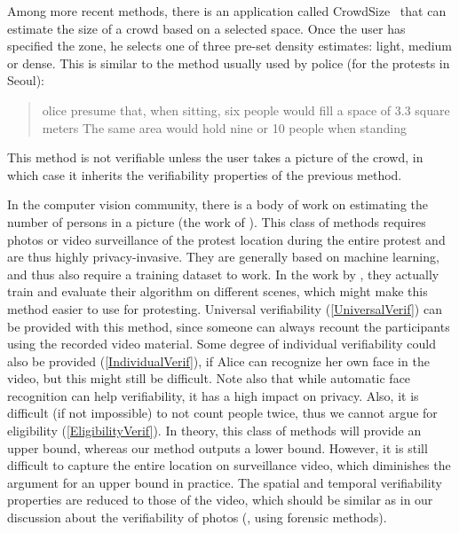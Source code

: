 Among more recent methods, there is an application called CrowdSize~\cite{CrowdSize} that can estimate the size of a crowd 
based on a selected space.
Once the user has specified the zone, he selects one of three pre-set density estimates: light, medium or dense.
This is similar to the method usually used by police (\eg for the protests in Seoul):
\blockcquote{2016DemonstrationsInSeoul}{%
  olice presume that, when sitting, six people would 
  fill a space of 
  3.3 square meters
  \textelp{}
  The same area would hold nine or 10 people when standing%
}.
This method is not verifiable unless the user takes a picture of the crowd, in which case it inherits the verifiability properties of the previous method.

In the computer vision community, there is a body of work on estimating the number of persons in a picture (\eg the work of 
\citet{NNCrowdCounting}).
This class of methods requires photos or video surveillance of the protest location during the entire protest and are thus highly privacy-invasive.
They are generally based on machine learning, and thus also require a training 
dataset to work.
In the work by \citet{NNCrowdCounting}, they actually train and evaluate their algorithm on different scenes, which might make this method easier to use for protesting.
Universal verifiability (\cref{UniversalVerif}) can be provided with this method, since someone can always recount the participants using the recorded video material.
Some degree of individual verifiability could also be provided (\cref{IndividualVerif}), if Alice can recognize her own face in the video, but this might still be difficult. 
Note also that while automatic face recognition can help verifiability, it has a high impact on privacy.
Also, it is difficult (if not impossible) to not count people twice, thus we cannot argue for eligibility (\cref{EligibilityVerif}).
In theory, this class of methods will provide an upper bound, whereas our method outputs a lower bound.
However, it is still difficult to capture the entire location on surveillance 
video, which diminishes the argument for an upper bound in practice.
The spatial and temporal verifiability properties are reduced to those of the video, which should be similar as in our discussion about the verifiability of photos (\ie, using forensic methods).

